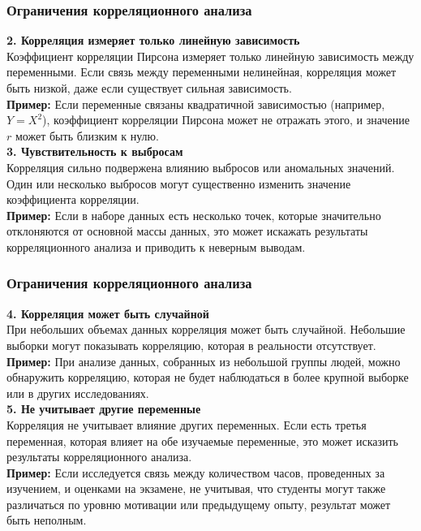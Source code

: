 \documentclass[aspectratio=169]{beamer}
\begin{document}
\begin{frame}
\frametitle{Ограничения корреляционного анализа}
{\bf 2. Корреляция измеряет только линейную зависимость}\\
Коэффициент корреляции Пирсона измеряет только линейную зависимость между переменными. Если связь между переменными нелинейная, корреляция может быть низкой, даже если существует сильная зависимость.\\
{\bf Пример:} Если переменные связаны квадратичной зависимостью (например, \( Y = X^2 \)), коэффициент корреляции Пирсона может не отражать этого, и значение \( r \) может быть близким к нулю.
\newline\\
{\bf 3. Чувствительность к выбросам}\\Корреляция сильно подвержена влиянию выбросов или аномальных значений. Один или несколько выбросов могут существенно изменить значение коэффициента корреляции.\\
{\bf Пример:} Если в наборе данных есть несколько точек, которые значительно отклоняются от основной массы данных, это может искажать результаты корреляционного анализа и приводить к неверным выводам.
\end{frame}

\begin{frame}
\frametitle{Ограничения корреляционного анализа}
{\bf 4. Корреляция может быть случайной}\\
При небольших объемах данных корреляция может быть случайной. Небольшие выборки могут показывать корреляцию, которая в реальности отсутствует.\\
{\bf Пример:} При анализе данных, собранных из небольшой группы людей, можно обнаружить корреляцию, которая не будет наблюдаться в более крупной выборке или в других исследованиях.
\newline\\
{\bf 5. Не учитывает другие переменные}\\
Корреляция не учитывает влияние других переменных. Если есть третья переменная, которая влияет на обе изучаемые переменные, это может исказить результаты корреляционного анализа.\\
{\bf Пример:} Если исследуется связь между количеством часов, проведенных за изучением, и оценками на экзамене, не учитывая, что студенты могут также различаться по уровню мотивации или предыдущему опыту, результат может быть неполным.
\end{frame}
\end{document}
